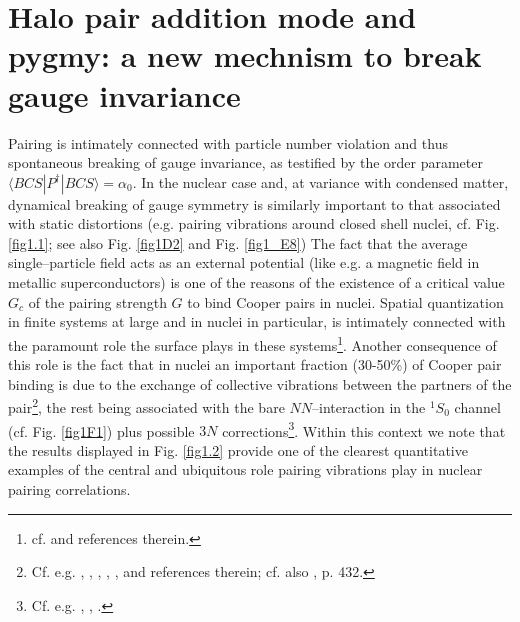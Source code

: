 \section[Halo pair addition mode and pygmy]{Halo pair addition mode and pygmy: a new mechnism to break gauge invariance}\label{App1AF}
Pairing is intimately connected with particle number violation and thus spontaneous breaking of gauge invariance, as testified by the order parameter\\ \mbox{$\langle BCS|P^{\dagger}|BCS\rangle=\alpha_0$}.  In the nuclear case and, at variance with condensed matter, dynamical breaking of gauge symmetry is similarly important to that associated with static distortions (e.g. pairing vibrations around closed shell nuclei, cf. Fig. \ref{fig1.1}; see also Fig. \ref{fig1D2} and Fig. \ref{fig1_E8}) The fact that the average single--particle field acts as an external potential (like e.g. a magnetic field in metallic superconductors) is one of the reasons of the existence of a critical value $G_c$ of the pairing strength $G$ to bind Cooper pairs in nuclei. Spatial quantization in finite systems at large and in nuclei in particular, is intimately connected with the paramount role the surface plays in these systems\footnote{cf. \cite{Broglia:02d} and references therein.}. Another consequence of this role is  the fact that in nuclei an important fraction (30-50\%) of Cooper pair binding is due to the exchange of collective vibrations between the partners of the pair\footnote{ Cf. e.g. \cite{Barranco:99}, \cite{Brink:05}, \cite{Saperstein:12}, \cite{Avdenkov:12}, \cite{Lombardo:12}, and references therein; cf. also \cite{Bohr:75}, p. 432.}, the rest being associated with the bare $NN$--interaction in the $^1S_0$ channel (cf. Fig. \ref{fig1F1}) plus possible $3N$ corrections\footnote{Cf. e.g. \cite{Lesinski:12}, \cite{Pankratov:11}, \cite{Hergert:09}.}. Within this context we note that the results displayed in Fig. \ref{fig1.2} provide one of the clearest quantitative examples of the central and ubiquitous role pairing vibrations play in nuclear pairing correlations.


